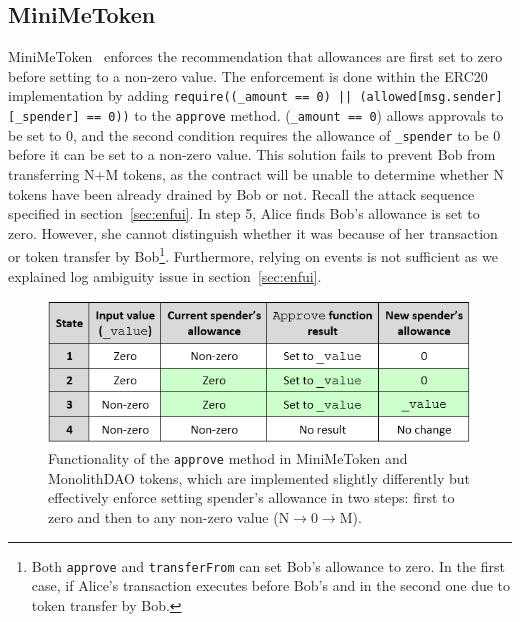 
\subsection{MiniMeToken}\label{sec:MiniMeToken}

MiniMeToken~\cite{Ref15} enforces the recommendation that allowances are first set to zero before setting to a non-zero value. The enforcement is done within the ERC20 implementation by adding \texttt{require((\_amount == 0) || (allowed[msg.sender][\_spender] == 0))} to the \texttt{approve} method. (\texttt{\_amount == 0}) allows approvals to be set to 0, and the second condition requires the allowance of \texttt{\_spender} to be 0 before it can be set to a non-zero value. This solution fails to prevent Bob from transferring N+M tokens, as the contract will be unable to determine whether N tokens have been already drained by Bob or not. Recall the attack sequence specified in section~\ref{sec:enfui}. In step 5, Alice finds Bob's allowance is set to zero. However, she cannot distinguish whether it was because of her transaction or token transfer by Bob\footnote{Both \texttt{approve} and \texttt{transferFrom} can set Bob's allowance to zero. In the first case, if Alice's transaction executes before Bob's and in the second one due to token transfer by Bob.}. Furthermore, relying on events is not sufficient as we explained log ambiguity issue in section~\ref{sec:enfui}.



\begin{figure}[t]
	\centering
	\includegraphics[width=1.0\linewidth]{figures/multiple_withdrawal_09.png}
	\caption{Functionality of the \texttt{approve} method in MiniMeToken and MonolithDAO tokens, which are implemented slightly differently but effectively enforce setting spender's allowance in two steps: first to zero and then to any non-zero value (\eg N$\rightarrow$0$\rightarrow$M).\label{fig:dao}}
\end{figure}

